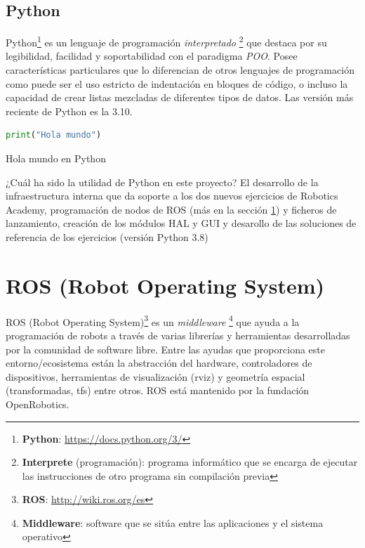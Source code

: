 \subsection{Python}
\label{subsec:python}

Python\footnote{\textbf{Python}: \url{https://docs.python.org/3/}} es un lenguaje de programación \textit{interpretado} \footnote{\textbf{Interprete} (programación): programa informático que se encarga de ejecutar las instrucciones de otro programa sin compilación previa} que destaca por su legibilidad, facilidad y soportabilidad con el paradigma \textit{POO}. Posee características particulares que lo diferencian de otros lenguajes de programación como puede ser el uso estricto de indentación en bloques de código, o incluso la capacidad de crear listas mezcladas de diferentes tipos de datos. Las versión más reciente de Python es la 3.10.\\

\begin{code}[H]
\begin{lstlisting}[language=Python]
print("Hola mundo")
\end{lstlisting}
\caption[Hola mundo en Python]{Hola mundo en Python}
\label{cod:holamundo_python}
\end{code}

¿Cuál ha sido la utilidad de Python en este proyecto? El desarrollo de la infraestructura interna que da soporte a los dos nuevos ejercicios de Robotics Academy, programación de nodos de ROS (más en la sección \ref{sec:ros}) y ficheros de lanzamiento, creación de los módulos HAL y GUI y desarollo de las soluciones de referencia de los ejercicios (versión Python 3.8)\\




\section{ROS (Robot Operating System)}
\label{sec:ros}
ROS (Robot Operating System)\footnote{\textbf{ROS}: \url{http://wiki.ros.org/es}} es un \textit{middleware} \footnote{\textbf{Middleware}: software que se sitúa entre las aplicaciones y el sistema operativo} que ayuda a la programación de robots a través de varias librerías y herramientas desarrolladas por la comunidad de software libre. Entre las ayudas que proporciona este entorno/ecosistema están la abstracción del hardware, controladores de dispositivos, herramientas de visualización (rviz) y geometría espacial (transformadas, tfs) entre otros. ROS está mantenido por la fundación OpenRobotics.\\

